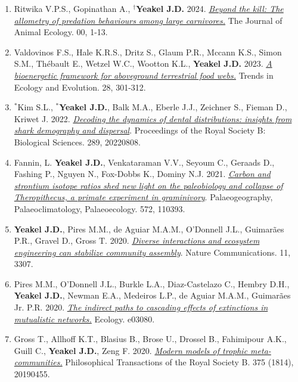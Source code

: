 \documentclass[margin,line,12pt]{res}
\begin{document}
\begin{resume}
\begin{enumerate}
\item Ritwika V.P.S., Gopinathan A., \textbf{${}^\dag$Yeakel J.D.} 2024. \href{https://besjournals.onlinelibrary.wiley.com/doi/10.1111/1365-2656.14070}{\emph{Beyond the kill: The allometry of predation behaviours among large carnivores.}} The Journal of Animal Ecology. 00, 1-13.

\item Valdovinos F.S., Hale K.R.S., Dritz S., Glaum P.R., Mccann K.S., Simon S.M., Thébault E., Wetzel W.C., Wootton K.L.,  \textbf{Yeakel J.D.} 2023. \href{https://www.sciencedirect.com/science/article/pii/S0169534722002841}{\emph{A bioenergetic framework for aboveground terrestrial food webs.}} Trends in Ecology and Evolution. 28, 301-312.

\item ${}^\ast$Kim S.L., \textbf{${}^\ast$Yeakel J.D.}, Balk M.A., Eberle J.J., Zeichner S., Fieman D., Kriwet J. 2022. \href{https://doi.org/10.1098/rspb.2022.0808}{\emph{Decoding the dynamics of dental distributions: insights from shark demography and dispersal}}. Proceedings of the Royal Society B: Biological Sciences. 289, 20220808.

\item Fannin, L. \textbf{Yeakel J.D.}, Venkataraman V.V., Seyoum C., Geraads D., Fashing P., Nguyen N., Fox-Dobbs K., Dominy N.J.  2021. \href{https://doi.org/10.1016/j.palaeo.2021.110393}{\emph{ Carbon and strontium isotope ratios shed new light on the paleobiology and collapse of Theropithecus, a primate experiment in graminivory}}. Palaeogeography, Palaeoclimatology, Palaeoecology. 572, 110393.

\item \textbf{Yeakel J.D.}, Pires M.M., de Aguiar M.A.M., O'Donnell J.L., Guimar\~aes P.R., Gravel D., Gross T. 2020. \href{https://www.nature.com/articles/s41467-020-17164-x}{\emph{Diverse interactions and ecosystem engineering can stabilize community assembly}}. Nature Communications. 11, 3307.

\item Pires M.M., O'Donnell J.L., Burkle L.A., Diaz-Castelazo C., Hembry D.H., \textbf{Yeakel J.D.}, Newman E.A., Medeiros L.P., de Aguiar M.A.M., Guimar\~aes Jr. P.R. 2020. \href{https://esajournals.onlinelibrary.wiley.com/doi/pdf/10.1002/ecy.3080}{\emph{The indirect paths to cascading effects of extinctions in mutualistic networks.}} Ecology. e03080.

\item Gross T., Allhoff K.T., Blasius B., Brose U., Drossel B., Fahimipour A.K., Guill C., \textbf{Yeakel J.D.}, Zeng F. 2020. \href{https://royalsocietypublishing.org/doi/pdf/10.1098/rstb.2019.0455}{\emph{Modern models of trophic meta-communities.}} Philosophical Transactions of the Royal Society B. 375 (1814), 20190455.


\end{enumerate}
\end{resume}
\end{document}
